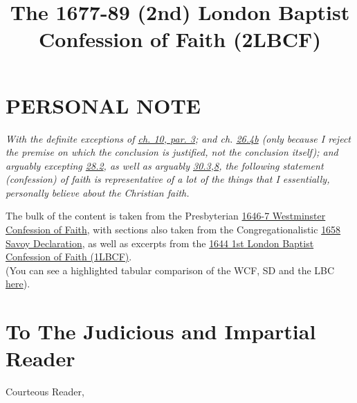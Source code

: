 \documentclass[12pt,a4paper]{book}
\title{The 1677-89 (2nd) London Baptist Confession of Faith (2LBCF)}
\date{}
\begin{document}
\frontmatter

\maketitle

\chapter*{PERSONAL NOTE}
\emph{With the definite exceptions of \hyperref[ch-eff-cal-3]{ch. 10, par. 3}; and ch. \hyperref[ch-chu-4]{26.4b} (only because I reject the premise on which the conclusion is justified, not the conclusion itself); and arguably excepting \hyperref[ch-ords-2]{28.2}, as well as arguably \hyperref[ch-lor-sup-3]{30.3},\hyperref[ch-lor-sup-8]{8}, the following statement (confession) of faith is representative of a lot of the things that I essentially, personally believe about the Christian faith.}
\par
The bulk of the content is taken from the Presbyterian \href{https://www.ligonier.org/learn/articles/westminster-confession-faith/}{1646-7 Westminster Confession of Faith}, with sections also taken from the Congregationalistic \href{http://apostles-creed.org/wp-content/uploads/2014/07/the-savoy-declaration-of-faith-and-order-1658.pdf}{1658 Savoy Declaration}, as well as excerpts from the \href{http://www.reformedreader.org/ccc/1644lbc.htm}{1644 1st London Baptist Confession of Faith (1LBCF)}.\\
(You can see a highlighted tabular comparison of the WCF, SD and the LBC \href{https://www.proginosko.com/docs/wcf_sdfo_lbcf.html}{here}).

\tableofcontents

\chapter{To The Judicious and Impartial Reader}
Courteous Reader,
\end{document}
